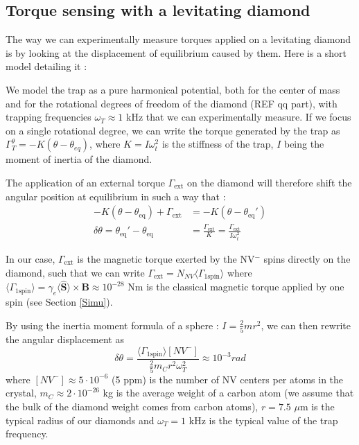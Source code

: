 \documentclass[preprintnumbers,amsmath,amssymb,onecolumn,12pt]{revtex4}
\begin{document}
\subsection{Torque sensing with a levitating diamond}

The way we can experimentally measure torques applied on a levitating diamond is by looking at the displacement of equilibrium caused by them. Here is a short model detailing it :

We model the trap as a pure harmonical potential, both for the center of mass and for the rotational degrees of freedom of the diamond (REF qq part), with trapping frequencies $\omega_T \approx 1$ kHz that we can experimentally measure. If we focus on a single rotational degree, we can write the torque generated by the trap as $\Gamma_T^\theta=-K(\theta-\theta_{eq})$, where $K=I \omega_t^2$ is the stiffness of the trap, $I$ being the moment of inertia of the diamond.

The application of an external torque $\Gamma_{\mathrm{ext}}$ on the diamond will therefore shift the angular position at equilibrium in such a way that : 
\begin{align*}
-K(\theta-\theta_{\mathrm{eq}}) + \Gamma_{\mathrm{ext}} &= -K(\theta-\theta_{\mathrm{eq}}') \\
\delta\theta = \theta_{\mathrm{eq}}'-\theta_{\mathrm{eq}} &= \frac{\Gamma_{\mathrm{ext}}}{K}=\frac{\Gamma_{\mathrm{ext}}}{I \omega_t^2}
\end{align*}

In our case, $\Gamma_{\mathrm{ext}}$ is the magnetic torque exerted by the NV$^-$ spins directly on the diamond, such that we can write $\Gamma_{\mathrm{ext}} = N_{NV} \langle \Gamma_{\mathrm{1 spin}} \rangle$  where $\langle \Gamma_{\mathrm{1 spin}} \rangle = \gamma_e \langle\hat{\mathbf S}\rangle \times \mathbf B \approx 10^{-28}$ Nm is the classical magnetic torque applied by one spin (see Section  \ref{Simu}). 

By using the inertia moment formula of a sphere : $I=\frac{2}{5}m r^2$, we can then rewrite the angular displacement as $$ \delta\theta = \frac{\langle\Gamma_{\mathrm{1 spin}}\rangle [NV^-]}{\frac{2}{5}m_Cr^2\omega_T^2} \approx 10^{-3} rad$$ where $[NV^-] \approx 5 \cdot 10^{-6}$ (5 ppm) is the number of NV centers per atoms in the crystal, $m_C \approx 2 \cdot 10^{-26}$ kg is the average weight of a carbon atom (we assume that the bulk of the diamond weight comes from carbon atoms), $r= 7.5$ $\mu$m is the typical radius of our diamonds and $\omega_T = 1$ kHz is the typical value of the trap frequency.
\end{document}

